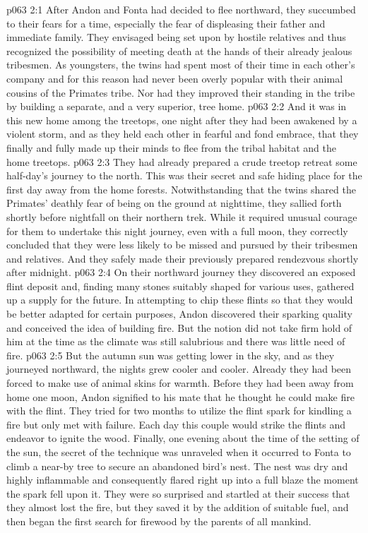 \vs p063 2:1 After Andon and Fonta had decided to flee northward, they succumbed to their fears for a time, especially the fear of displeasing their father and immediate family. They envisaged being set upon by hostile relatives and thus recognized the possibility of meeting death at the hands of their already jealous tribesmen. As youngsters, the twins had spent most of their time in each other’s company and for this reason had never been overly popular with their animal cousins of the Primates tribe. Nor had they improved their standing in the tribe by building a separate, and a very superior, tree home.
\vs p063 2:2 And it was in this new home among the treetops, one night after they had been awakened by a violent storm, and as they held each other in fearful and fond embrace, that they finally and fully made up their minds to flee from the tribal habitat and the home treetops.
\vs p063 2:3 They had already prepared a crude treetop retreat some half\hyp{}day’s journey to the north. This was their secret and safe hiding place for the first day away from the home forests. Notwithstanding that the twins shared the Primates’ deathly fear of being on the ground at nighttime, they sallied forth shortly before nightfall on their northern trek. While it required unusual courage for them to undertake this night journey, even with a full moon, they correctly concluded that they were less likely to be missed and pursued by their tribesmen and relatives. And they safely made their previously prepared rendezvous shortly after midnight.
\vs p063 2:4 On their northward journey they discovered an exposed flint deposit and, finding many stones suitably shaped for various uses, gathered up a supply for the future. In attempting to chip these flints so that they would be better adapted for certain purposes, Andon discovered their sparking quality and conceived the idea of building fire. But the notion did not take firm hold of him at the time as the climate was still salubrious and there was little need of fire.
\vs p063 2:5 But the autumn sun was getting lower in the sky, and as they journeyed northward, the nights grew cooler and cooler. Already they had been forced to make use of animal skins for warmth. Before they had been away from home one moon, Andon signified to his mate that he thought he could make fire with the flint. They tried for two months to utilize the flint spark for kindling a fire but only met with failure. Each day this couple would strike the flints and endeavor to ignite the wood. Finally, one evening about the time of the setting of the sun, the secret of the technique was unraveled when it occurred to Fonta to climb a near\hyp{}by tree to secure an abandoned bird’s nest. The nest was dry and highly inflammable and consequently flared right up into a full blaze the moment the spark fell upon it. They were so surprised and startled at their success that they almost lost the fire, but they saved it by the addition of suitable fuel, and then began the first search for firewood by the parents of all mankind.
